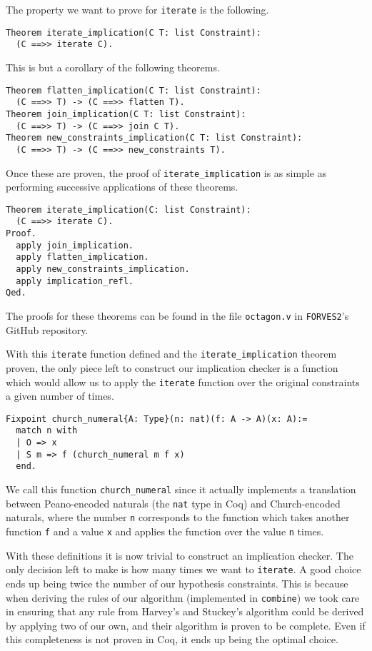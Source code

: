 The property we want to prove for \texttt{iterate} is the following.

\begin{verbatim}
Theorem iterate_implication(C T: list Constraint):
  (C ==>> iterate C).
\end{verbatim}

This is but a corollary of the following theorems.
\begin{verbatim}
Theorem flatten_implication(C T: list Constraint):
  (C ==>> T) -> (C ==>> flatten T).
Theorem join_implication(C T: list Constraint):
  (C ==>> T) -> (C ==>> join C T).
Theorem new_constraints_implication(C T: list Constraint):
  (C ==>> T) -> (C ==>> new_constraints T).
\end{verbatim}

Once these are proven, the proof of \texttt{iterate_implication} is as simple as performing
successive applications of these theorems.
\begin{verbatim}
Theorem iterate_implication(C: list Constraint):
  (C ==>> iterate C).
Proof.
  apply join_implication.
  apply flatten_implication.
  apply new_constraints_implication.
  apply implication_refl.
Qed.
\end{verbatim}

The proofs for these theorems can be found in the file \verb|octagon.v| in \verb|FORVES2|'s GitHub
repository.

With this \texttt{iterate} function defined and the \texttt{iterate_implication}
theorem proven, the only piece left to construct our implication checker is a function which would
allow us to apply the \texttt{iterate} function over the original constraints a given
number of times.

\begin{verbatim}
Fixpoint church_numeral{A: Type}(n: nat)(f: A -> A)(x: A):=
  match n with
  | O => x
  | S m => f (church_numeral m f x)
  end.
\end{verbatim}

We call this function \texttt{church_numeral} since it actually implements a translation
between Peano-encoded naturals (the \texttt{nat} type in Coq) and Church-encoded naturals,
where the number \texttt{n} corresponds to the function which takes another function 
\texttt{f} and a value \texttt{x} and applies the function over the value 
\texttt{n} times.

With these definitions it is now trivial to construct an implication checker. The only decision
left to make is how many times we want to \texttt{iterate}. A good choice ends up
being twice the number of our hypothesis constraints. This is because when deriving the rules of
our algorithm (implemented in \texttt{combine}) we took care in ensuring that any rule
from Harvey's and Stuckey's algorithm\cite{HarveyStuckey} could be derived by applying two of 
our own, and their algorithm is proven to be complete. Even if this completeness is not proven
in Coq, it ends up being the optimal choice.


